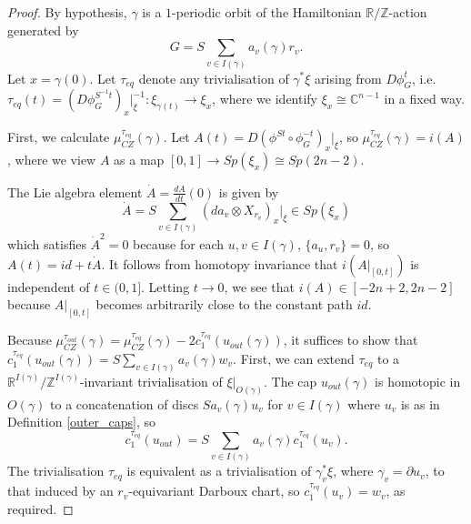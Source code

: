 \documentclass[10pt,a4paper]{amsart}
\begin{document}
\begin{proof}
By hypothesis, $\gamma$ is a $1$-periodic orbit of the Hamiltonian $\mathbb{R}/\mathbb{Z}$-action generated by
\begin{equation}
G=S\sum_{v\in I(\gamma)}a_v(\gamma)r_v.
\end{equation}
Let $x=\gamma(0)$. Let $\tau_{eq}$ denote any trivialisation of $\gamma^*\xi$ arising from $D\phi^t_G$, i.e. $\tau_{eq}(t)=(D\phi_G^{S^{-1}t})_x|_\xi^{-1}:\xi_{\gamma(t)}\rightarrow \xi_x$, where we identify $\xi_x\cong\mathbb{C}^{n-1}$ in a fixed way.

First, we calculate $\mu_{CZ}^{\tau_{eq}}(\gamma)$. Let $A(t)=D(\phi^{St}\circ \phi_G^{-t})_x|_\xi$, so $\mu_{CZ}^{\tau_{eq}}(\gamma)=i(A)$, where we view $A$ as a map $[0,1]\rightarrow Sp(\xi_x)\cong Sp(2n-2)$.

The Lie algebra element $\dot{A}=\frac{dA}{dt}(0)$ is given by
\begin{equation}
\label{lie_element}
    \dot{A}=S\sum_{v\in I(\gamma)}\left(da_v\otimes X_{r_v}\right)_x|_\xi\in Sp(\xi_x)
\end{equation}
which satisfies $\dot{A}^2=0$ because for each $u,v\in I(\gamma)$, $\{a_u,r_v\}=0$, so $A(t)=id+t\dot{A}$. It follows from homotopy invariance that $i(A|_{[0,t]})$ is independent of $t\in (0,1]$. Letting $t\to 0$, we see that $i(A)\in [-2n+2,2n-2]$ because $A|_{[0,t]}$ becomes arbitrarily close to the constant path $id$.

Because $\mu_{CZ}^{\tau_{out}}(\gamma)=\mu_{CZ}^{\tau_{eq}}(\gamma)-2c_1^{\tau_{eq}}(u_{out}(\gamma))$, it suffices to show that $c_1^{\tau_{eq}}(u_{out}(\gamma))=S\sum_{v\in I(\gamma)}a_v(\gamma)w_v$.  First, we can extend $\tau_{eq}$ to a $\mathbb{R}^{I(\gamma)}/\mathbb{Z}^{I(\gamma)}$-invariant trivialisation of $\xi|_{O(\gamma)}$. The cap $u_{out}(\gamma)$ is homotopic in $O(\gamma)$ to a concatenation of discs $Sa_v(\gamma)u_v$ for $v\in I(\gamma)$ where $u_v$ is as in Definition \ref{outer_caps}, so
\begin{equation}
    c_1^{\tau_{eq}}(u_{out})=S\sum_{v\in I(\gamma)}a_v(\gamma)c_1^{\tau_{eq}}(u_v).
\end{equation}
The trivialisation $\tau_{eq}$ is equivalent as a trivialisation of $\gamma_v^*\xi$, where $\gamma_v=\partial u_v$, to that induced by an $r_v$-equivariant Darboux chart, so $c_1^{\tau_{eq}}(u_v)=w_v$, as required.
\end{proof}
\end{document}

